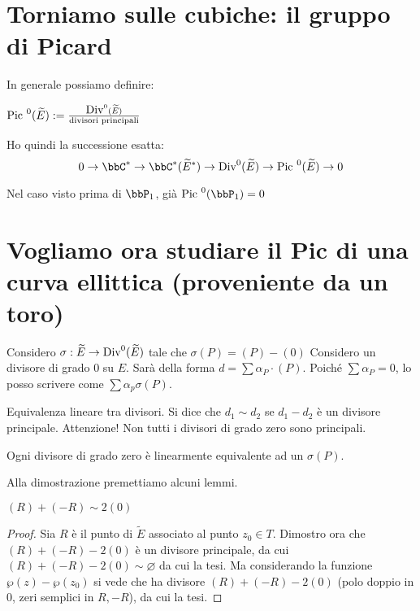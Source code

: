 \section{Torniamo sulle cubiche: il gruppo di Picard}
In generale possiamo definire:

\begin{definizione}
$\mbox{Pic }^0(\widetilde{E}) := \frac{\mbox{Div}^0(\widetilde{E})}{\text{divisori principali}}$
\end{definizione}

\begin{osservazione}
Ho quindi la successione esatta:
$$0 \rightarrow \bbC^* \rightarrow \bbC^*(\widetilde{E}^*) \rightarrow \Div^0(\widetilde{E})\rightarrow \Pic^0(\widetilde{E})\rightarrow 0$$
\end{osservazione}

Nel caso visto prima di $\bbP_1$, già $\Pic^0(\bbP_1)=0$


\section{Vogliamo ora studiare il Pic di una curva ellittica (proveniente da un toro)}

Considero $\sigma : \widetilde E \rightarrow \mbox{Div}^0(\widetilde E)$ tale che $\sigma(P)=(P)-(0)$
Considero un divisore di grado $0$ su $E$. Sarà della forma $d = \sum\alpha_P\cdot(P)$.
Poiché $\sum \alpha_P=0$, lo posso scrivere come $\sum\alpha_p \sigma(P)$.

\begin{definizione}
Equivalenza lineare tra divisori. Si dice che $d_1 \sim d_2$ se $d_1-d_2$ è un divisore principale. Attenzione! Non tutti i divisori di grado zero sono principali.
\end{definizione}

\begin{teorema}
  \label{teorema_divisori_semplici}
Ogni divisore di grado zero è linearmente equivalente ad un $\sigma(P)$.
\end{teorema}

Alla dimostrazione premettiamo alcuni lemmi.
\begin{lemma}
  \label{lemma_equiv_lin}
$(R) + (-R) \sim 2(0)$
\end{lemma}
\begin{proof}
Sia $R$ è il punto di $\widetilde E$ associato al punto $z_0 \in T$.
Dimostro ora che $(R)+(-R)-2(0)$ è un divisore principale, da cui $(R)+(-R)-2(0) \sim \varnothing$ da cui la tesi.
Ma considerando la funzione $\wp(z)-\wp(z_0)$ si vede che ha divisore $(R)+(-R)-2(0)$ (polo doppio in $0$, zeri semplici in $R,-R$), da cui la tesi.
\end{proof}


